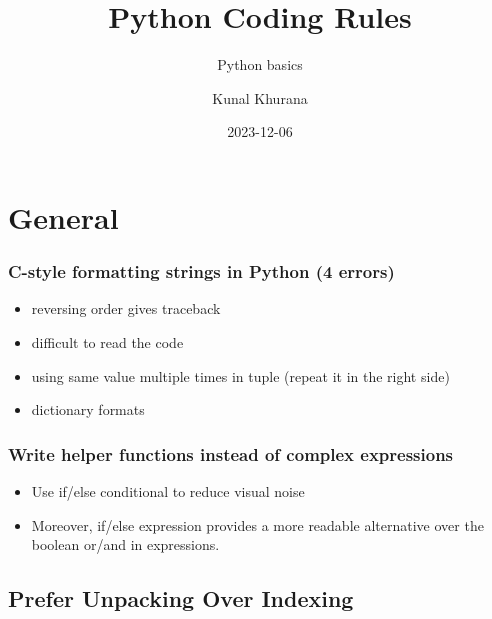 \documentclass[
]{report}
\title{Python Coding Rules}
\subtitle{Python basics}
\author{Kunal Khurana}
\date{2023-12-06}
\providecommand{\tightlist}{%
  \setlength{\itemsep}{0pt}\setlength{\parskip}{0pt}}\usepackage{longtable,booktabs,array}
\renewcommand*\contentsname{Table of contents}
\newcommand\contentsname{Table of contents}
\begin{document}
\maketitle
\ifdefined\Shaded\renewenvironment{Shaded}{\begin{tcolorbox}[enhanced, interior hidden, sharp corners, boxrule=0pt, frame hidden, breakable, borderline west={3pt}{0pt}{shadecolor}]}{\end{tcolorbox}}\fi

\renewcommand*\contentsname{Table of contents}
{
\hypersetup{linkcolor=}
\setcounter{tocdepth}{2}
\tableofcontents
}
\hypertarget{general}{%
\section{General}\label{general}}

\hypertarget{c-style-formatting-strings-in-python-4-errors}{%
\subsubsection{C-style formatting strings in Python (4
errors)}\label{c-style-formatting-strings-in-python-4-errors}}

\begin{itemize}
\tightlist
\item
  reversing order gives traceback
\item
  difficult to read the code
\item
  using same value multiple times in tuple (repeat it in the right side)
\item
  dictionary formats
\end{itemize}

\hypertarget{write-helper-functions-instead-of-complex-expressions}{%
\subsubsection{Write helper functions instead of complex
expressions}\label{write-helper-functions-instead-of-complex-expressions}}

\begin{itemize}
\tightlist
\item
  Use if/else conditional to reduce visual noise
\item
  Moreover, if/else expression provides a more readable alternative over
  the boolean or/and in expressions.
\end{itemize}

\hypertarget{prefer-unpacking-over-indexing}{%
\subsection{Prefer Unpacking Over
Indexing}\label{prefer-unpacking-over-indexing}}
\end{document}
